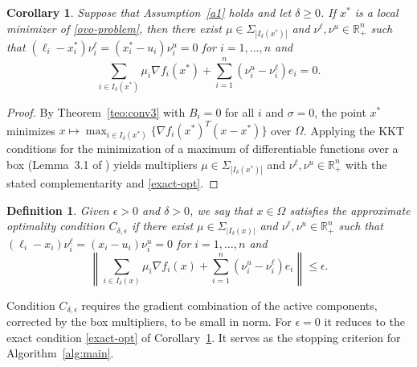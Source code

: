 \documentclass[11pt]{article}
\newtheorem{corollary}[theorem]{Corollary}
\newtheorem{definition}[theorem]{Definition}
\newcounter{alg}[section]
\begin{document}
\begin{corollary} \label{cor:exact}
Suppose that Assumption~\ref{a1} holds and let $\delta \geq 0$. If $x^*$ is a
local minimizer of \eqref{ovo-problem}, then there exist
$\mu \in \Sigma_{|I_\delta(x^*)|}$ and $\nu^\ell, \nu^u \in \mathbb{R}^n_+$ such
that $(\ell_i - x^*_i)\nu^\ell_i = (x^*_i - u_i)\nu^u_i = 0$ for
$i = 1, \ldots, n$ and
\begin{equation} \label{exact-opt}
\sum_{i \in I_\delta(x^*)} \mu_i \nabla f_i(x^*)
+ \sum_{i=1}^n (\nu^u_i - \nu^\ell_i) e_i = 0.
\end{equation}
\end{corollary}

\begin{proof}
By Theorem~\ref{teo:conv3} with $B_i = 0$ for all $i$ and $\sigma = 0$, the
point $x^*$ minimizes
$x \mapsto \max_{i \in I_\delta(x^*)} \{ \nabla f_i(x^*)^T(x - x^*) \}$ over
$\Omega$. Applying the KKT conditions for the minimization of a maximum of
differentiable functions over a box (Lemma~3.1 of \cite{alvarezovo}) yields
multipliers $\mu \in \Sigma_{|I_\delta(x^*)|}$ and
$\nu^\ell, \nu^u \in \mathbb{R}^n_+$ with the stated complementarity and
\eqref{exact-opt}.
\end{proof}

\begin{definition} \label{def:optcond}
Given $\epsilon > 0$ and $\delta > 0$, we say that $x \in \Omega$ satisfies the
\textit{approximate optimality condition} $C_{\delta,\epsilon}$ if there exist
$\mu \in \Sigma_{|I_\delta(x)|}$ and $\nu^\ell, \nu^u \in \mathbb{R}^n_+$ such
that $(\ell_i - x_i)\nu^\ell_i = (x_i - u_i)\nu^u_i = 0$ for $i = 1, \ldots, n$
and
\begin{equation} \label{miaprox-box}
\left\| \sum_{i \in I_\delta(x)} \mu_i \nabla f_i(x)
+ \sum_{i=1}^{n} (\nu^u_i - \nu^\ell_i) e_i \right\| \leq \epsilon.
\end{equation}
\end{definition}

Condition $C_{\delta,\epsilon}$ requires the gradient combination of the active
components, corrected by the box multipliers, to be small in norm. For
$\epsilon = 0$ it reduces to the exact condition \eqref{exact-opt} of
Corollary~\ref{cor:exact}. It serves as the stopping criterion for
Algorithm~\ref{alg:main}.
\end{document}
